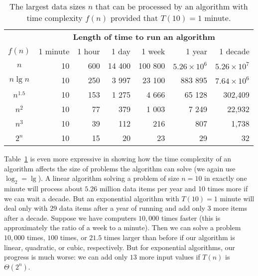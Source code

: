 \begin{table}[htbp] 
\caption[The largest data sizes $n$ that can be
processed by an algorithm.]%
{\label{t:data-size} The largest data sizes $n$ that can be
processed by an algorithm with time complexity $f(n)$
provided that $T(10)= 1$ minute.} 
\begin{center}
   \begin{tabular}{|c|r|r|r|r|r|r|} \hline
      & \multicolumn{6}{|c|}{\textbf{Length of time to run an algorithm}}\\
                \cline{2-7}
$f(n)$  & 1 minute & 1 hour & 1 day & 1 week & 1 year & 1 decade  \\
\hline
  $n$         & 10  & 600 & 14 400 & 100 800 & $5.26\times 10^{6}$  &
$5.26\times  10^{7}$  \\ \hline 
  $n\lg n$    & 10  & 250 & 3 997 & 23 100  & 883 895   & $7.64\times 10^6$
  \\ \hline 
  $n^{1.5}$    & 10  & 153 &  1 275 &   4 666 &    65 128 &
   302,409   \\ \hline 
  $n^{2}$      & 10  &  77 &    379 &   1 003 &     7 249 &
    22,932   \\ \hline 
  $n^{3}$      & 10  &  39 &    112 &     216 &       807 &
     1,738  \\ \hline 
  $2^{n}$      & 10  &  15 &     20 &      23 &        29 &
        32   \\ \hline
   \end{tabular}
   \end{center} 
 \end{table} 
 
Table~\ref{t:data-size} is even more expressive in showing
how the time complexity of an algorithm affects the size of problems the
algorithm can solve (we again use $\log_{2} = \lg$). A linear algorithm solving 
a problem of size $n=10$ in exactly one minute will process about $5.26$ million  
data items per year and 10 times more if we can wait a decade. 
But an exponential algorithm  with \(T(10)=1\) minute will deal
only with $29$ data items after a year of running and add only $3$
more items after a decade.  Suppose we have computers $10,000$ times
faster (this is approximately the ratio of a week to a minute). Then 
we can solve a problem $10,000$ times, $100$ times, or $21.5$ times 
larger than before if our algorithm is linear, quadratic, or cubic, 
respectively. But for exponential algorithms, our progress is much worse: 
we can add only $13$ more input values if $T(n)$ is $\Theta(2^n)$.

